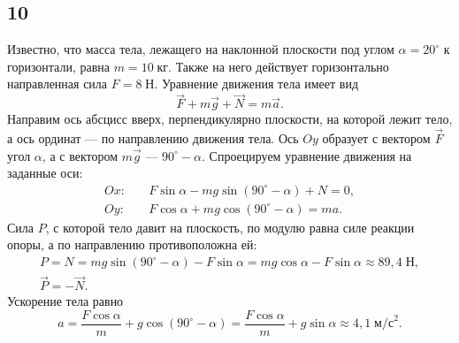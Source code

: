 \subsection{10}

Известно, что масса тела, лежащего на наклонной плоскости под углом $\alpha=20^\circ$ к горизонтали, равна $m=10\;\text{кг}$. Также на него действует горизонтально направленная сила $F=8\;\text{Н}$. Уравнение движения тела имеет вид
\[
\vec F+m\vec g+\vec N=m\vec a.
\]
Направим ось абсцисс вверх, перпендикулярно плоскости, на которой лежит тело, а ось ординат --- по направлению движения тела. Ось $Oy$ образует с вектором $\vec F$ угол $\alpha$, а с вектором $m\vec g$ --- $90^\circ-\alpha$. Спроецируем уравнение движения на заданные оси:
\[
\begin{array}{ll}
Ox:\quad & F\sin\alpha-mg\sin(90^\circ-\alpha)+N=0, \\
Oy:\quad & F\cos\alpha+mg\cos(90^\circ-\alpha)=ma.
\end{array}
\]
Сила $P$, с которой тело давит на плоскость, по модулю равна силе реакции опоры, а по направлению противоположна ей:
\begin{gather*}
P=N=mg\sin(90^\circ-\alpha)-F\sin\alpha=mg\cos\alpha-F\sin\alpha\approx89{,}4\;\text{Н}, \\
\vec P=-\vec N.
\end{gather*}
Ускорение тела равно
\[
a=\frac{F\cos\alpha}{m}+g\cos(90^\circ-\alpha)=\frac{F\cos\alpha}{m}+g\sin\alpha\approx4{,}1\;\text{м/с}^2.
\]